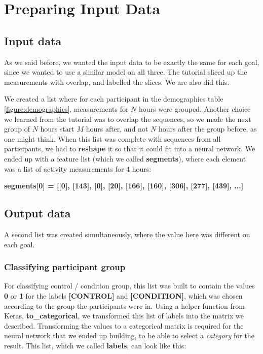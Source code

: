 \section{Preparing Input Data}

\subsection{Input data}

As we said before, we wanted the input data to be exactly the same for each goal, since we wanted to use a similar model on all three.
The tutorial \cite{1d_cnn} sliced up the measurements with overlap, and labelled the slices. We are also did this.

We created a list where for each participant in the demographics table \ref{figure:demographics}, measurements for $N$ hours were grouped. 
Another choice we learned from the tutorial was to overlap the sequences, so we made the next group of $N$ hours start \textit{$M$} hours after, 
and not \textit{$N$} hours after the group before, as one might think. When this list was complete with sequences from all participants, we 
had to \textbf{reshape} it so that it could fit into a neural network. We ended up with a feature list (which we called \textbf{segments}), 
where each element was a list of activity measurements for 4 hours: 

\textbf{segments[0] = [[0], [143], [0], [20], [166], [160], [306], [277], [439], ...]}

\subsection{Output data}

A second list was created simultaneously, where the value here was different on each goal. 

\subsubsection{Classifying participant group}
For classifying control / condition group, this list was built to contain the values \textbf{0} or \textbf{1} for the labels
\textbf{[CONTROL]} and \textbf{[CONDITION]}, which was chosen according to the group the participants were in. Using a helper function from Keras, 
\textbf{to\_categorical}, we transformed this list of labels into the matrix we described. Transforming the values to a
categorical matrix is required for the neural network that we ended up building, to be able to select a \textit{category} for the result. 
This list, which we called \textbf{labels}, can look like this: 

